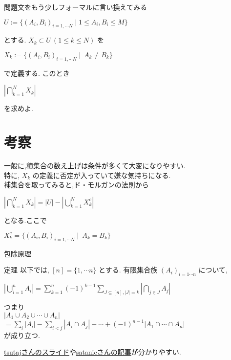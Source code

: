 \documentclass[dvipdfmx,12pt]{beamer}%
\begin{document}
\begin{frame}
\begin{block}{問題文をもう少しフォーマルに言い換えてみる}
\begin{center}
$ U :=  \{(A_i, B_i)_{i = 1, \cdots N} \mid 1 \leq A_i, B_i \leq M \} $ \\
\end{center}
とする. $ X_k \subset U \ (1 \leq k \leq N) $ を\\
\begin{center}
$ X_k := \{(A_i, B_i)_{i = 1, \cdots N} \mid \ A_k \neq B_k \} $
\end{center}
で定義する. このとき\\
\begin{center}
$ \displaystyle \left| \bigcap_{k = 1}^N X_k \right| $ \\
\end{center}
を求めよ.
\end{block} 
\end{frame}

\section{考察}
\begin{frame}
一般に,積集合の数え上げは条件が多くて大変になりやすい.\\
特に, $ X_k $ の定義に否定が入っていて嫌な気持ちになる.\\
補集合を取ってみると,ド・モルガンの法則から

\begin{center}
$ \displaystyle \left| \bigcap_{k = 1}^N X_k \right| = \left| U \right| - \left| \bigcup_{k = 1}^N X_k^c \right| $ \\
\end{center}
となる.ここで
\begin{center}
$ X_k^c = \{(A_i, B_i)_{i = 1, \cdots N} \mid \ A_k = B_k \} $
\end{center}

\end{frame}

\begin{frame}{包除原理}
\begin{block}{定理}
以下では, $ [n] = \{ 1, \cdots n \} $ とする.
有限集合族 $(A_i)_{i = 1\cdots n} $ について,
\begin{center}
$ \displaystyle \left|\bigcup_{i=1}^{n} A_{i}\right| =\sum_{k=1}^{n}(-1)^{k-1} \sum_{J \subseteq[n],|J|=k}\left|\bigcap_{j \in J} A_{j}\right| $
\end{center}
つまり\\
$ \displaystyle |A_1\cup A_2\cup\cdots\cup A_n| $  \\
$ \displaystyle =\sum_{i}\left|A_{i}\right|-\sum_{i<j}\left|A_{i} \cap A_{j}\right|+\cdots + (-1)^{n-1}\left|A_{1} \cap \cdots \cap A_{n}\right| $ \\
が成り立つ.
\end{block}
\href{http://compro.tsutajiro.com/archive/181015_incexc.pdf}{tsutajさんのスライド}や\href{http://satanic0258.hatenablog.com/entry/2016/04/10/104524}{satanicさんの記事}が分かりやすい.
\end{frame}
\end{document}
